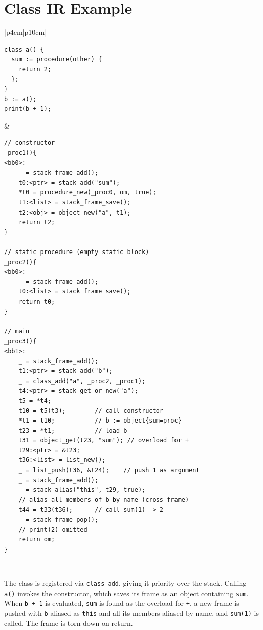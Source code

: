 \section{Class \ac{IR} Example}

\FloatBarrier
\begin{table}[h]
    \centering
    \caption{Class \ac{IR} Example}
    \renewcommand{\arraystretch}{1}
    \begin{tabular}{ |p{4cm}|p{10cm}| }
        \hline
\begin{lstlisting}
class a() {
  sum := procedure(other) {
    return 2;
  };
}
b := a();
print(b + 1);
\end{lstlisting}
&
\begin{lstlisting}
// constructor
_proc1(){
<bb0>:
    _ = stack_frame_add();
    t0:<ptr> = stack_add("sum");
    *t0 = procedure_new(_proc0, om, true);
    t1:<list> = stack_frame_save();
    t2:<obj> = object_new("a", t1);
    return t2;
}

// static procedure (empty static block)
_proc2(){
<bb0>:
    _ = stack_frame_add();
    t0:<list> = stack_frame_save();
    return t0;
}

// main
_proc3(){
<bb1>:
    _ = stack_frame_add();
    t1:<ptr> = stack_add("b");
    _ = class_add("a", _proc2, _proc1);
    t4:<ptr> = stack_get_or_new("a");
    t5 = *t4;
    t10 = t5(t3);        // call constructor
    *t1 = t10;           // b := object{sum=proc}
    t23 = *t1;           // load b
    t31 = object_get(t23, "sum"); // overload for +
    t29:<ptr> = &t23;
    t36:<list> = list_new();
    _ = list_push(t36, &t24);    // push 1 as argument
    _ = stack_frame_add();
    _ = stack_alias("this", t29, true);
    // alias all members of b by name (cross-frame)
    t44 = t33(t36);      // call sum(1) -> 2
    _ = stack_frame_pop();
    // print(2) omitted
    return om;
}
\end{lstlisting}
        \\
        \hline
    \end{tabular}
\end{table}
\FloatBarrier

The class is registered via \texttt{class\_add}, giving it priority over the stack. Calling \texttt{a()} invokes the constructor, which saves its frame as an object containing \texttt{sum}. When \texttt{b + 1} is evaluated, \texttt{sum} is found as the overload for \texttt{+}, a new frame is pushed with \texttt{b} aliased as \texttt{this} and all its members aliased by name, and \texttt{sum(1)} is called. The frame is torn down on return.
